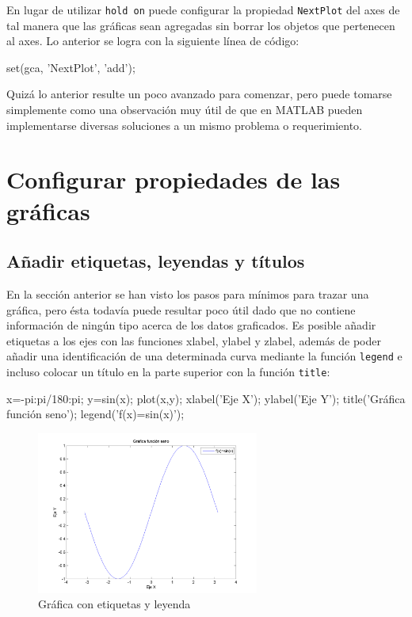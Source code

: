 En lugar de utilizar \texttt{hold on} puede configurar la propiedad
\texttt{NextPlot} del axes de tal manera que las gráficas sean agregadas
sin borrar los objetos que pertenecen al axes. Lo anterior se logra con
la siguiente línea de código:

\begin{matlab}
set(gca, 'NextPlot', 'add');
\end{matlab}

Quizá lo anterior resulte un poco avanzado para comenzar, pero puede
tomarse simplemente como una observación muy útil de que en MATLAB
pueden implementarse diversas soluciones a un mismo problema o
requerimiento.

\section{Configurar propiedades de las gráficas}

\subsection{Añadir etiquetas, leyendas y títulos}

En la sección anterior se han visto los pasos para mínimos para trazar
una gráfica, pero ésta todavía puede resultar poco útil dado que no
contiene información de ningún tipo acerca de los datos graficados. Es
posible añadir etiquetas a los ejes con las funciones xlabel, ylabel y
zlabel, además de poder añadir una identificación de una determinada
curva mediante la función \texttt{legend} e incluso colocar un título en
la parte superior con la función \texttt{title}:

\begin{matlab}
x=-pi:pi/180:pi;
y=sin(x);
plot(x,y);
xlabel('Eje X');
ylabel('Eje Y');
title('Gráfica función seno');
legend('f(x)=sin(x)');
\end{matlab}

\begin{figure}[htbp]
    \centering
    \includegraphics[width=0.65\textwidth]{images/ch4/img_4_4.png}
    \caption{Gráfica con etiquetas y leyenda}
    \label{fig:img_4_4}
\end{figure}


